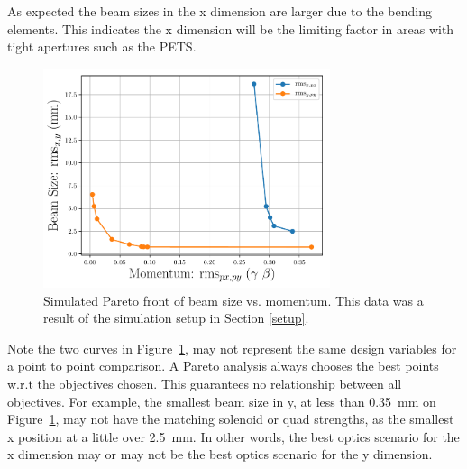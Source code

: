 As expected the beam sizes in the x dimension are larger 
due to the bending elements. This indicates the x dimension will be the 
limiting factor in areas with tight apertures such as the PETS.  
\iftrue
\begin{figure}
	\centering
	\includegraphics[width=0.75\textwidth]{./images/xy_vs_pxy_pareto_front_quads_before_Q5}
	\caption{Simulated Pareto front of beam size vs. momentum.
		This data was a result of the simulation setup in Section \ref{setup}.}
	\label{fig:tba-paretoxy}
\end{figure}
\fi
Note the two curves in Figure~\ref{fig:tba-paretoxy}, may not represent the same 
design variables for a point to point comparison. A Pareto analysis always 
chooses the best points w.r.t the objectives chosen. This guarantees no 
relationship between all objectives. 
For example, the smallest beam size in y, at less than \SI{0.35}{mm} on Figure~\ref{fig:tba-paretoxy}, 
may not have the  matching solenoid or quad strengths, as the smallest x position 
at a little over \SI{2.5}{mm}. In other words, the best optics scenario for the x dimension
may or may not be the best optics scenario for the y dimension. 

